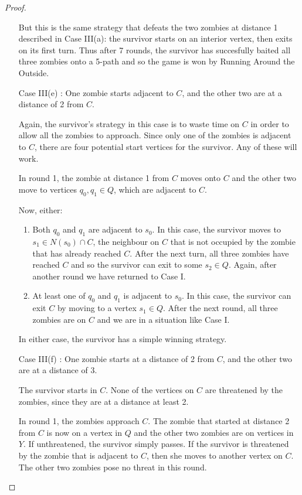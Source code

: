 \begin{proof}
\begin{enumerate}[I.]
But this is the same strategy that defeats the two zombies at distance 1 described in Case III(a): the survivor starts on an interior vertex, then exits on its first turn.
Thus after 7 rounds, the survivor has succesfully baited all three zombies onto a 5-path and so the game is won by Running Around the Outside.

\item[Case III(e)]: One zombie starts adjacent to $C$, and the other two are at a distance of 2 from $C$.

Again, the survivor's strategy in this case is to waste time on $C$ in order to allow all the zombies to approach. Since only one of the
zombies is adjacent to $C$, there are four potential start vertices for the survivor. Any of these will work.

In round 1, the zombie at distance 1 from $C$ moves onto $C$ and the other two move to vertices $q_0, q_1 \in Q$,
which are adjacent to $C$.

Now, either:

\begin{enumerate}
\item Both $q_0$ and $q_1$ are adjacent to $s_0$. In this case, the survivor moves to $s_1 \in N(s_0) \cap C$, the neighbour on $C$ that is not occupied
by the zombie that has already reached $C$. After the next turn, all three zombies have reached $C$ and so the survivor can
exit to some $s_2 \in Q$. Again, after another round we have returned to Case I.

\item At least one of $q_0$ and $q_1$ is adjacent to $s_0$. In this case, the survivor can exit $C$ by moving to a vertex $s_1 \in Q$. After the next
round, all three zombies are on $C$ and we are in a situation like Case I.
\end{enumerate}

In either case, the survivor has a simple winning strategy.

\item[Case III(f)]: One zombie starts at a distance of 2 from $C$, and the other two are at a distance of 3.

The survivor starts in $C$. None of the vertices on $C$ are threatened by the zombies, since they are at a distance at least 2.

In round 1, the zombies approach $C$. The zombie that started at distance 2 from $C$ is now on a vertex in $Q$ and the other two
zombies are on vertices in $Y$. If unthreatened, the survivor simply passes.
If the survivor is threatened by the zombie that is adjacent to $C$, then she moves to another vertex on $C$. The other two zombies
pose no threat in this round.


\end{enumerate}
\end{proof}
